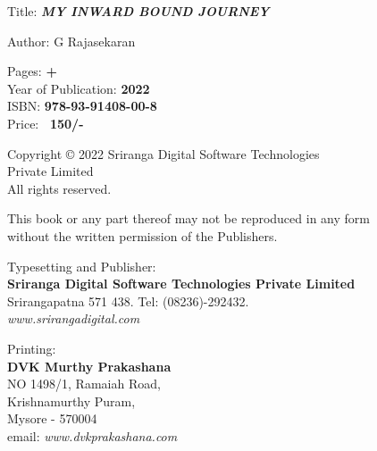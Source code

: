 \thispagestyle{empty}

\noindent
Title: {\sl\bfseries MY INWARD BOUND JOURNEY}
\medskip

\noindent
Author:  G Rajasekaran    

\vfill

\noindent
Pages: {\bf \pageref{foreword} + \pageref{bookend}}\\
Year of Publication: {\bf 2022}\\
ISBN: {\bf 978-93-91408-00-8}\\
Price: {\bf \rupee\ 150/-}
\vfill

\noindent
Copyright © 2022 Sriranga Digital Software Technologies\\ Private Limited\\
All rights reserved.
\vfill

\noindent
This book or any part thereof may not be reproduced in any form\\ without the written permission of the Publishers.
\vfill

\noindent
Typesetting and Publisher:\\
{\bf Sriranga Digital Software Technologies Private Limited}\\ 
Srirangapatna 571 438. Tel: (08236)-292432.\\
{\sl www.srirangadigital.com}\\
\vfill

\noindent
Printing:\\
{\bf DVK Murthy Prakashana}\\
NO 1498/1, Ramaiah Road,\\ 
Krishnamurthy Puram,\\ 
Mysore - 570004\\
email: {\sl www.dvkprakashana.com}
